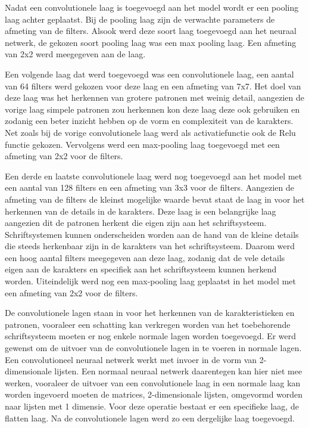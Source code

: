 Nadat een convolutionele laag is toegevoegd aan het model wordt er een pooling laag achter geplaatst.
Bij de pooling laag zijn de verwachte parameters de afmeting van de filters.
Alsook werd deze soort laag toegevoegd aan het neuraal netwerk, 
de gekozen soort pooling laag was een max pooling laag.
Een afmeting van 2x2 werd meegegeven aan de laag.

Een volgende laag dat werd toegevoegd was een convolutionele laag,
een aantal van 64 filters werd gekozen voor deze laag en een afmeting van 7x7.
Het doel van deze laag was het herkennen van grotere patronen met weinig detail, aangezien de vorige laag simpele patronen zou herkennen kon deze laag deze ook gebruiken en zodanig een beter inzicht hebben op de vorm en complexiteit van de karakters.
Net zoals bij de vorige convolutionele laag werd als activatiefunctie ook de Relu functie gekozen.
Vervolgens werd een max-pooling laag toegevoegd met een afmeting van 2x2 voor de filters.

Een derde en laatste convolutionele laag werd nog toegevoegd aan het model met een aantal van 128 filters en een afmeting van 3x3 voor de filters.
Aangezien de afmeting van de filters de kleinst mogelijke waarde bevat staat de laag in voor het herkennen van de details in de karakters.
Deze laag is een belangrijke laag aangezien dit de patronen herkent die eigen zijn aan het schriftsysteem.
Schriftsystemen kunnen onderscheiden worden aan de hand van de kleine details die steeds herkenbaar zijn in de karakters van het schriftsysteem.
Daarom werd een hoog aantal filters meegegeven aan deze laag, zodanig dat de vele details eigen aan de karakters en specifiek aan het schriftsysteem kunnen herkend worden.
Uiteindelijk werd nog een max-pooling laag geplaatst in het model met een afmeting van 2x2 voor de filters.

De convolutionele lagen staan in voor het herkennen van de karakteristieken en patronen, vooraleer een schatting kan verkregen worden van het toebehorende schriftsysteem moeten er nog enkele normale lagen worden toegevoegd.
Er werd gewenst om de uitvoer van de convolutionele lagen in te voeren in normale lagen.
Een convolutioneel neuraal netwerk werkt met invoer in de vorm van 2-dimensionale lijsten.
Een normaal neuraal netwerk daarentegen kan hier niet mee werken, vooraleer de uitvoer van een convolutionele laag in een normale laag kan worden ingevoerd moeten de matrices, 2-dimensionale lijsten, omgevormd worden naar lijsten met 1 dimensie.
Voor deze operatie bestaat er een specifieke laag, de flatten laag.
Na de convolutionele lagen werd zo een dergelijke laag toegevoegd.

